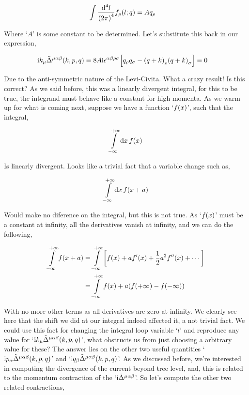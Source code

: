 \begin{align}
    \int\frac{\dd[4]{l}}{\qty(2\pi)^4}f_\rho\qty(l;q)&=Aq_\rho\nonumber
\end{align}

Where `$A$' is some constant to be determined. Let's substitute this back in our expression,

\begin{align}
    \textnormal{i} k_\mu{\tilde\Delta}^{\mu\alpha\beta}\qty(k,p,q)&=8A\textnormal{i}\epsilon^{\alpha\beta\rho\sigma}
    \qty[ q_\rho q_\sigma-\qty(q+k)_\rho\qty(q+k)_\sigma]=0\nonumber
\end{align}

Due to the anti-symmetric nature of the Levi-Civita. What a crazy result! Is this correct? As we said before, 
this was a linearly divergent integral, for this to be true, the integrand must behave like a constant for 
high momenta. As we warm up for what is coming next, suppose we have a function `$f\qty(x)$', such that the 
integral,

\begin{align}
    \int\limits_{-\infty}^{+\infty}\dd{x}f\qty(x)\nonumber
\end{align}

Is linearly divergent. Looks like a trivial fact that a variable change such as,

\begin{align}
    \int\limits_{-\infty}^{+\infty}\dd{x}f\qty(x+a)\nonumber
\end{align}

Would make no diference on the integral, but this is not true. As `$f\qty(x)$' must be a constant at infinity, all the derivatives vanish at infinity, 
and we can do the following,

\begin{align}
    \int\limits_{-\infty}^{+\infty}f\qty(x+a)&=\int\limits_{-\infty}^{+\infty}\qty[f\qty(x)+af'\qty(x)+\frac12a^2f''\qty(x)+\cdots]\nonumber\\
    &=\int\limits_{-\infty}^{+\infty}f\qty(x)+a\qty(f\qty(+\infty)-f\qty(-\infty))\nonumber
\end{align}

With no more other terms as all derivatives are zero at infinity. We clearly see here that the shift we did at 
our integral indeed affected it, a not trivial fact. We could use this fact for changing the integral loop 
variable `$l$' and reproduce any value for `$\textnormal{i} k_\mu{\tilde\Delta}^{\mu\alpha\beta}\qty(k,p,q)$', what 
obstructs us from just choosing a arbitrary value for these? The answer lies on the other two useful quantities 
`$\textnormal{i} p_\alpha{\tilde\Delta}^{\mu\alpha\beta}\qty(k,p,q)$' and `$\textnormal{i} q_\beta{\tilde\Delta}^{\mu\alpha\beta}\qty(k,p,q)$'. 
As we discussed before, we're interested in computing the divergence of the current beyond tree level, and, this 
is related to the momentum contraction of the `$\textnormal{i}{\tilde\Delta}^{\mu\alpha\beta}$'. So let's compute the other 
two related contractions,

